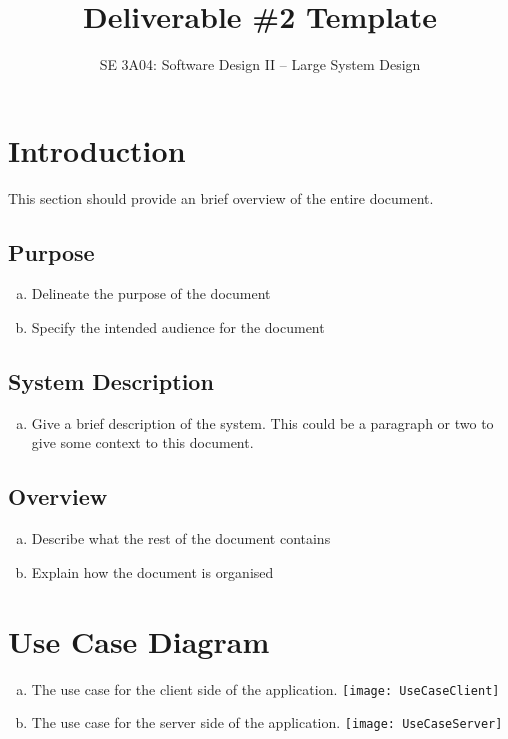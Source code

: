 \documentclass[]{article}
\title{Deliverable \#2 Template}
\author{SE 3A04: Software Design II -- Large System Design}
\date{}
\begin{document}
\maketitle	

\section{Introduction}
\label{sec:introduction}

This section should provide an brief overview of the entire document.

\subsection{Purpose}
\label{sub:purpose}
\begin{enumerate}[a)]
	\item Delineate the purpose of the document
	\item Specify the intended audience for the document
\end{enumerate}

\subsection{System Description}
\label{sub:system_description}
\begin{enumerate}[a)]
	\item Give a brief description of the system. This could be a paragraph or two to give some context to this document.
\end{enumerate}

\subsection{Overview}
\label{sub:overview}
\begin{enumerate}[a)]
	\item Describe what the rest of the document contains 
	\item Explain how the document is organised
\end{enumerate}


\section{Use Case Diagram}
\label{sec:use_case_diagram}
\begin{enumerate}[a)]
	\item The use case for the client side of the application.\newline
	\texttt{[image: UseCaseClient]}
	\newpage
	\item The use case for the server side of the application.\newline
	\texttt{[image: UseCaseServer]}
\end{enumerate}
\end{document}
